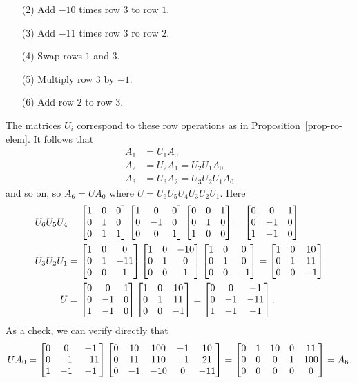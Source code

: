 \documentclass[a4paper]{amsart}
\renewenvironment{solution}{\SolutionInline}{\endSolutionInline}
\begin{document}
\begin{solution}
\begin{itemize}
  \item[(2)] Add $-10$ times row $3$ to row $1$.
  \item[(3)] Add $-11$ times row $3$ ro row $2$.
  \item[(4)] Swap rows $1$ and $3$.
  \item[(5)] Multiply row $3$ by $-1$.
  \item[(6)] Add row $2$ to row $3$.
 \end{itemize}
 The matrices $U_i$ correspond to these row operations as in
 Proposition~\ref{prop-ro-elem}.  It follows that
 \begin{align*}
  A_1 &= U_1A_0 \\
  A_2 &= U_2A_1 = U_2U_1A_0 \\
  A_3 &= U_3A_2 = U_3U_2U_1A_0
 \end{align*}
 and so on, so $A_6=UA_0$ where $U=U_6U_5U_4U_3U_2U_1$.
 Here 
 \begin{align*}
  U_6U_5U_4 &= \left[\begin{matrix} 1&0&0 \\ 0&1&0 \\ 0&1&1 \end{matrix}\right]
               \left[\begin{matrix} 1&0&0 \\ 0&-1&0 \\ 0&0&1 \end{matrix}\right]
               \left[\begin{matrix} 0&0&1 \\ 0&1&0 \\ 1&0&0 \end{matrix}\right]
             = \left[\begin{matrix} 0&0&1 \\ 0&-1&0 \\1&-1&0 \end{matrix}\right] \\
  U_3U_2U_1 &= \left[\begin{matrix} 1&0&0 \\ 0&1&-11 \\ 0&0&1 \end{matrix}\right]
               \left[\begin{matrix} 1&0&-10 \\ 0&1&0 \\ 0&0&1 \end{matrix}\right]
               \left[\begin{matrix} 1&0&0 \\ 0&1&0 \\ 0&0&-1 \end{matrix}\right]
             = \left[\begin{matrix} 1&0&10 \\ 0&1&11 \\ 0&0&-1 \end{matrix}\right] \\
  U         &= \left[\begin{matrix} 0&0&1 \\ 0&-1&0 \\1&-1&0 \end{matrix}\right]
               \left[\begin{matrix} 1&0&10 \\ 0&1&11 \\ 0&0&-1 \end{matrix}\right] 
             = \left[\begin{matrix} 0&0&-1 \\ 0&-1&-11 \\ 1&-1&-1 \end{matrix}\right].
 \end{align*}
 As a check, we can verify directly that
 \[ UA_0 = 
    \left[\begin{matrix} 0&0&-1 \\ 0&-1&-11 \\ 1&-1&-1 \end{matrix}\right]
    \left[\begin{matrix} 0 & 10 & 100 & -1 &  10 \\
         0 & 11 & 110 & -1 &  21 \\
         0 & -1 & -10 &  0 & -11
    \end{matrix}\right] = 
    \left[\begin{matrix} 0 &  1 &  10 &  0 &   11 \\
         0 &  0 &   0 &  1 &  100 \\
         0 &  0 &   0 &  0 &    0
    \end{matrix}\right] =
    A_6.
 \]
\end{solution}
\end{document}
